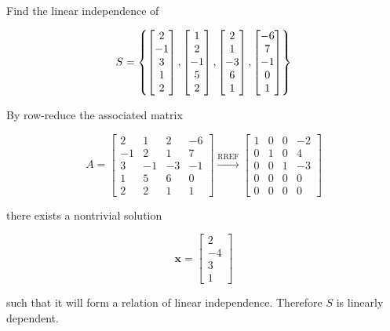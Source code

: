 \documentclass[a4paper,12pt]{article}
\begin{document}
\begin{exm}
  Find the linear independence of

  $$S=\left\{ \begin{bmatrix}
    2\\
    -1\\
    3\\
    1\\
    2
  \end{bmatrix},\begin{bmatrix}
    1\\
    2\\
    -1\\
    5\\
    2
  \end{bmatrix},\begin{bmatrix}
    2\\
    1\\
    -3\\
    6\\
    1
  \end{bmatrix},\begin{bmatrix}
    -6\\
    7\\
    -1\\
    0\\
    1
  \end{bmatrix}\right\}$$\s

  \ans By row-reduce the associated matrix

  $$A=\begin{bmatrix}
    2 & 1 & 2 & -6\\
    -1 & 2 & 1 & 7\\
    3 & -1 & -3 & -1\\
    1 & 5 & 6 & 0\\
    2 & 2 & 1 & 1
  \end{bmatrix}\xrightarrow[ ]{\text{RREF}}\begin{bmatrix}
    1 & 0 & 0 & -2\\
    0 & 1 & 0 & 4\\
    0 & 0 & 1 & -3\\
    0 & 0 & 0 & 0\\
    0 & 0 & 0 & 0
  \end{bmatrix}$$\s

  there exists a nontrivial solution

  $$\mathbf{x}=\begin{bmatrix}
    2\\
    -4\\
    3\\
    1
  \end{bmatrix}$$\s

  such that it will form a relation of linear independence. Therefore $S$ is linearly dependent.
\end{exm}\n
\end{document}
